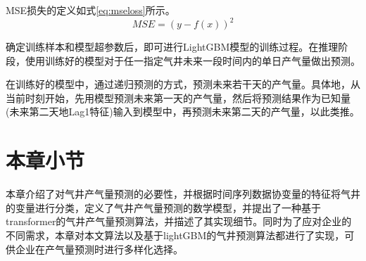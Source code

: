 MSE损失的定义如式\eqref{eq:mseloss}所示。
\begin{equation}
    MSE = (y - f(x))^2
    \label{eq:mseloss}
\end{equation}

确定训练样本和模型超参数后，即可进行LightGBM模型的训练过程。在推理阶段，使用训练好的模型对于任一指定气井未来一段时间内的单日产气量做出预测。

在训练好的模型中，通过递归预测的方式，预测未来若干天的产气量。具体地，从当前时刻开始，先用模型预测未来第一天的产气量，然后将预测结果作为已知量(未来第二天地Lag1特征)输入到模型中，再预测未来第二天的产气量，以此类推。

\section{本章小节}
本章介绍了对气井产气量预测的必要性，并根据时间序列数据协变量的特征将气井的变量进行分类，定义了气井产气量预测的数学模型，并提出了一种基于transformer的气井产气量预测算法，并描述了其实现细节。同时为了应对企业的不同需求，本章对本文算法以及基于lightGBM的气井预测算法都进行了实现，可供企业在产气量预测时进行多样化选择。
